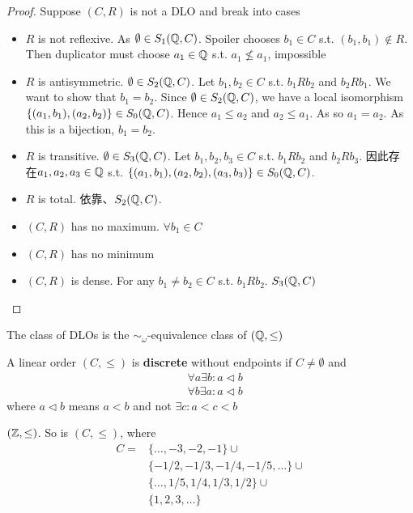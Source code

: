 \documentclass[11pt]{article}
\begin{document}
\begin{proof}
Suppose \((C,R)\) is not a DLO and break into cases
\begin{itemize}
\item \(R\) is not reflexive. As \(\emptyset\in S_1(\mathbb{Q},C)\). Spoiler chooses \(b_1\in C\) s.t. \((b_1,b_1)\notin R\). Then duplicator must
choose \(a_1\in\mathbb{Q}\) s.t. \(a_1\not\le a_1\), impossible
\item \(R\) is antisymmetric. \(\emptyset\in S_2(\mathbb{Q},C)\). Let \(b_1,b_2\in C\) s.t. \(b_1Rb_2\) and \(b_2Rb_1\). We want
to show that \(b_1=b_2\). Since \(\emptyset\in S_2(\mathbb{Q},C)\), we have a local
isomorphism \(\{(a_1,b_1),(a_2,b_2)\}\in S_0(\mathbb{Q},C)\). Hence \(a_1\le a_2\) and \(a_2\le a_1\). As so \(a_1=a_2\).
As this is a bijection, \(b_1=b_2\).
\item \(R\) is transitive. \(\emptyset\in S_3(\mathbb{Q},C)\). Let \(b_1,b_2,b_3\in C\) s.t. \(b_1Rb_2\) and \(b_2Rb_3\).  因此存
在\(a_1,a_2,a_3\in\mathbb{Q}\) s.t. \(\{(a_1,b_1),(a_2,b_2),(a_3,b_3)\}\in S_0(\mathbb{Q},C)\).
\item \(R\) is total. 依靠、\(S_2(\mathbb{Q},C)\).
\item \((C,R)\) has no maximum. \(\forall b_1\in C\)
\item \((C,R)\) has no minimum
\item \((C,R)\) is dense. For any \(b_1\neq b_2\in C\) s.t. \(b_1Rb_2\). \(S_3(\mathbb{Q},C)\)
\end{itemize}
\end{proof}

\begin{corollary}[]
The class of DLOs is the \(\sim_\omega\)-equivalence class of \((\mathbb{Q},\le)\)
\end{corollary}

\begin{definition}[]
A linear order \((C,\le)\) is \textbf{discrete} without endpoints if \(C\neq\emptyset\) and
\begin{align*}
&\forall a\exists b:a\lhd b\\
&\forall b\exists a:a\lhd b
\end{align*}
where \(a\lhd b\) means \(a<b\)  and not \(\exists c:a<c<b\)
\end{definition}

\begin{examplle}[]
\((\mathbb{Z},\le)\). So is \((C,\le)\), where
\begin{align*}
C=&\{\dots,-3,-2,-1\}\cup\\
&\{-1/2,-1/3,-1/4,-1/5,\dots\}\cup\\
&\{\dots,1/5,1/4,1/3,1/2\}\cup\\
&\{1,2,3,\dots\}
\end{align*}
\end{examplle}
\end{document}
